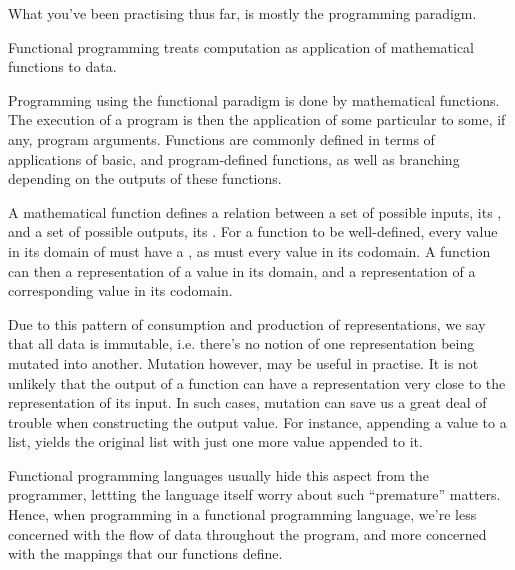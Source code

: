 
What you've been practising thus far, is mostly the 
programming paradigm.

\begin{definition}

Functional programming treats computation as application of mathematical
functions to  data.

\end{definition}

Programming using the functional paradigm is done by 
mathematical functions. The execution of a program is then the application of
some particular  to some, if any, program arguments.
Functions are commonly defined in terms of applications of basic, and
program-defined functions, as well as branching depending on the outputs of
these functions.

A mathematical function defines a relation between a set of possible inputs,
its , and a set of possible outputs, its . For a
function to be well-defined, every value in its domain of must have a
, as must every value in its codomain\footnotemark.
A function can then  a representation of a value in its domain,
and  a representation of a corresponding value in its codomain.


Due to this pattern of consumption and production of representations, we say
that all data is immutable, i.e. there's no notion of one representation being
mutated into another. Mutation however, may be useful in practise. It is not
unlikely that the output of a function can have a representation very close to
the representation of its input. In such cases, mutation can save us a great
deal of trouble when constructing the output value. For instance, appending a
value to a list, yields the original list with just one more value appended to
it.

Functional programming languages usually hide this aspect from the programmer,
lettting the language itself worry about such ``premature'' matters. Hence,
when programming in a functional programming language, we're less concerned
with the flow of data throughout the program, and more concerned with the
mappings that our functions define.
